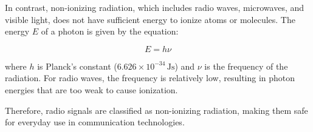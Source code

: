 In contrast, non-ionizing radiation, which includes radio waves, microwaves, and visible light, does not have sufficient energy to ionize atoms or molecules. The energy \(E\) of a photon is given by the equation:

\[
E = h \nu
\]

where \(h\) is Planck’s constant (\(6.626 \times 10^{-34} \, \text{Js}\)) and \(\nu\) is the frequency of the radiation. For radio waves, the frequency is relatively low, resulting in photon energies that are too weak to cause ionization.

Therefore, radio signals are classified as non-ionizing radiation, making them safe for everyday use in communication technologies.

